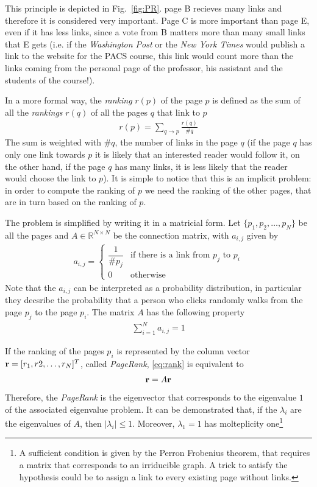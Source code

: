 This principle is depicted in Fig.~\ref{fig:PR}. page B recieves many links and
therefore it is considered very important. Page C is more important than page E,
even if it has less links, since a vote from B matters more than many small
links that E gets (i.e. if the \emph{Washington Post} or the
\emph{New York Times} would publish a link to the website for the PACS course,
this link would count more than the links coming from the personal page of the
professor, his assistant and the students of the course!).

In a more formal way, the \emph{ranking} $r(p)$ of the page $p$ is defined as
the sum of all the \emph{rankings} $r(q)$ of all the pages $q$ that link to $p$
\begin{align}
    \label{eq:rank}
    r(p)=\sum_{q \rightarrow p} \frac{r(q)}{\#q}
\end{align}
The sum is weighted with $\#q$, the number of links in the page $q$ (if the page
$q$ has only one link towards $p$ it is likely that an interested reader would
follow it, on the other hand, if the page $q$ has many links, it is less likely
that the reader would choose the link to $p$).
It is simple to notice that this is an implicit problem: in order to compute the
ranking of $p$ we need the ranking of the other pages, that are in turn based on
the ranking of $p$.

The problem is simplified by writing it in a matricial form. Let $\{p_1, p_2,
\dots, p_N\}$ be all the pages and $A \in \mathbb{R}^{N \times N}$ be the
connection matrix, with $a_{i,j}$ given by
\begin{align}
      \label{eq:harmonicp}
      a_{i,j}=
      \begin{cases}
        \dfrac{1}{\#p_j} & \text{if there is a link from $p_j$ to $p_i$} \\[1ex]
        0 &  \mbox{otherwise}
      \end{cases}
\end{align}
Note that the $a_{i,j}$ can be interpreted as a probability distribution, in
particular they decsribe the probability that a person who clicks randomly
walks from the page $p_j$ to the page $p_i$. The matrix $A$ has the following
property
\begin{align} \label{eq:sum1}
    \sum_{i=1}^{N} a_{i,j}=1
\end{align}

If the ranking of the pages $p_i$ is represented by the column vector $\mathbf{r} =
[r_1, r2, \dots, r_N]^T$, called \emph{PageRank}, \eqref{eq:rank} is equivalent
to
\begin{align*}
    \mathbf{r}=A \mathbf{r}
\end{align*}
Therefore, the \emph{PageRank} is the eigenvector that corresponds to the
eigenvalue $1$ of the associated eigenvalue problem. It can be demonstrated
that, if the $\lambda_i$ are the eigenvalues of $A$, then $|\lambda_i| \leq 1$.
Moreover, $\lambda_1=1$ has molteplicity one\footnote{A sufficient condition is
given by the Perron Frobenius theorem, that requires a matrix that corresponds
to an irriducible graph. A trick to satisfy the hypothesis could be to assign
a link to every existing page without links.}

